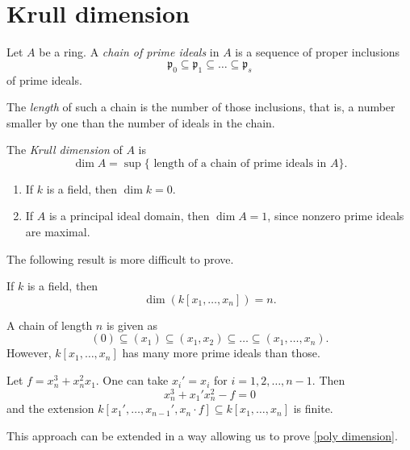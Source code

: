 \section{Krull dimension}

\begin{df}
  Let $A$ be a ring. A \textit{chain of prime ideals} in $A$ is a sequence of proper inclusions
  \[ \mathfrak p_0 \subseteq \mathfrak p_1 \subseteq \dotso \subseteq \mathfrak p_s\]
  of prime ideals.

  The \textit{length} of such a chain is the number of those inclusions, that is, a number smaller by one than the number of ideals in the chain.
\end{df}

\begin{df}
  The \textit{Krull dimension} of $A$ is
  \[ \dim A = \sup \{ \text{ length of a chain of prime ideals in $A$} \}.\]
\end{df}

\begin{example}
  \mbox{}
  \begin{enumerate}
  \item If $k$ is a field, then $\dim k = 0$.
  \item If $A$ is a principal ideal domain, then $\dim A = 1$, since nonzero prime ideals are maximal.
  \end{enumerate}
\end{example}

The following result is more difficult to prove.

\begin{theorem}
  \label{poly dimension}
  If $k$ is a field, then
  \[\dim (k[x_1, \dotsc, x_n]) = n.\]
\end{theorem}

A chain of length $n$ is given as
\[ (0) \subseteq (x_1) \subseteq (x_1, x_2) \subseteq \dotso \subseteq (x_1, \dotsc, x_n).\]
However, $k[x_1, \dotsc, x_n]$ has many more prime ideals than those.

\begin{example}
  Let $f = x_n^3 + x_n^2 x_1$. One can take $x_i' = x_i$ for $i=1, 2, \dotsc, n-1$. Then
  \[ x_n^3 + x_1' x_n^2 - f = 0\]
  and the extension $k[x_1', \dotsc, x_{n-1}', x_n \cdot f] \subseteq k[x_1, \dotsc, x_n]$ is finite.
\end{example}

This approach can be extended in a way allowing us to prove \cref{poly dimension}.

